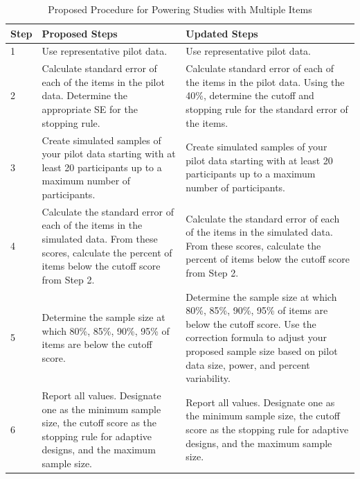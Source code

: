 \documentclass[
  man]{apa7}
\begin{document}
\begin{table}[tbp]

\begin{center}
\begin{threeparttable}

\caption{\label{tab:table-summary}Proposed Procedure for Powering Studies with Multiple Items}

\footnotesize{

\begin{tabular}{m{1cm}m{6cm}m{6cm}}
\toprule
Step & Proposed Steps & Updated Steps\\
\midrule
1 & Use representative pilot data. & Use representative pilot data.\\
2 & Calculate standard error of each of the items in the pilot data. Determine the appropriate SE for the stopping rule. & Calculate standard error of each of the items in the pilot data. Using the 40\%, determine the cutoff and stopping rule for the standard error of the items.\\
3 & Create simulated samples of your pilot data starting with at least 20 participants up to a maximum number of participants. & Create simulated samples of your pilot data starting with at least 20 participants up to a maximum number of participants.\\
4 & Calculate the standard error of each of the items in the simulated data. From these scores, calculate the percent of items below the cutoff score from Step 2. & Calculate the standard error of each of the items in the simulated data. From these scores, calculate the percent of items below the cutoff score from Step 2.\\
5 & Determine the sample size at which 80\%, 85\%, 90\%, 95\% of items are below the cutoff score. & Determine the sample size at which 80\%, 85\%, 90\%, 95\% of items are below the cutoff score. Use the correction formula to adjust your proposed sample size based on pilot data size, power, and percent variability.\\
6 & Report all values. Designate one as the minimum sample size, the cutoff score as the stopping rule for adaptive designs, and the maximum sample size. & Report all values. Designate one as the minimum sample size, the cutoff score as the stopping rule for adaptive designs, and the maximum sample size.\\
\bottomrule
\end{tabular}

}

\end{threeparttable}
\end{center}

\end{table}
\end{document}
